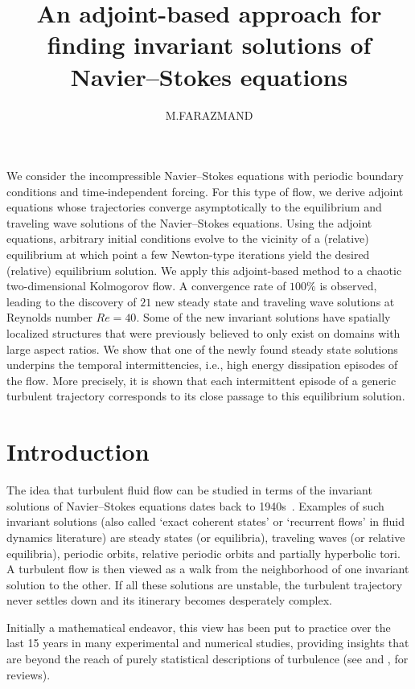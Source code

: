 \documentclass{jfm}
\title[Computing equilibrium solutions of the Navier--Stokes equation]
      {An adjoint-based approach for finding invariant
       solutions of Navier--Stokes equations}
\author[
M. FARAZMAND
        ]
{
M.\ns F\ls A\ls R\ls A\ls Z\ls M\ls A\ls N\ls D
}
\affiliation{
 Center for Nonlinear Science,
 School of Physics,
 Georgia Institute of Technology,
 Atlanta, GA  30332, USA
}
\begin{document}
\maketitle

We consider the incompressible Navier--Stokes equations with periodic boundary conditions and
time-independent forcing. For this type of flow, we derive adjoint equations whose
trajectories
converge asymptotically to the equilibrium and traveling wave solutions
of the Navier--Stokes equations. Using the adjoint equations,
arbitrary initial conditions evolve
to the vicinity of a (relative) equilibrium at which point a few
Newton-type iterations yield the desired (relative) equilibrium solution. We apply this
adjoint-based method
to a chaotic two-dimensional Kolmogorov flow. A convergence rate of $100\%$ is observed,
leading to the discovery
of $21$ new steady state and traveling wave solutions at Reynolds number $Re=40$.
Some of the new invariant solutions have spatially localized structures
that were previously believed to only exist on domains with large aspect ratios.
We show that one of the newly found
steady state solutions underpins the temporal intermittencies, i.e., high energy
dissipation episodes
of the flow. More precisely, it is shown that each intermittent episode of a generic turbulent
trajectory
corresponds to its close passage to this equilibrium solution.

\section{Introduction}\label{s:intro}
The idea that turbulent fluid flow can be studied in terms of
the invariant solutions of Navier--Stokes equations dates back to
1940s~\citep{hopf48}. Examples of such invariant solutions (also called
`exact coherent states' or `recurrent flows' in fluid dynamics
literature) are
steady states (or equilibria), traveling waves
(or relative equilibria), periodic orbits, relative periodic orbits and
partially hyperbolic tori.
A turbulent flow is then viewed as a walk from the neighborhood of
one invariant solution to the other. If all these solutions are unstable,
the turbulent trajectory never settles down and its itinerary becomes
desperately complex.

Initially a mathematical endeavor, this view has been put to practice over the last
15 years in many experimental and numerical studies, providing insights
that are beyond the reach of purely statistical descriptions of turbulence
(see  and , for reviews). %
\end{document}
